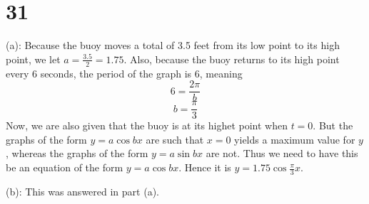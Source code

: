 \documentclass{article}
\theoremstyle{definition}
\newcommand{\?}{\stackrel{?}{=}}
\begin{document}
\section*{31}
(a): Because the buoy moves a total of 3.5 feet from its low point to its high point, we let $a=\frac{3.5}{2}=1.75$. Also, because the buoy returns to its high 
point every 6 seconds, the period of the graph is 6, meaning \[ 6=\frac{2\pi}{b} \] \[ b=\frac{\pi}{3} \] Now, we are also given that the buoy is at its highet point 
when $t=0$. But the graphs of the form $y=a\cos bx$ are such that $x=0$ yields a maximum value for $y$, whereas the graphs of the form $y=a\sin bx$ are not. Thus we need to 
have this be an equation of the form $y=a\cos bx$. Hence it is $y=1.75\cos\frac{\pi}{3}x$.


(b): This was answered in part (a).
\end{document}
